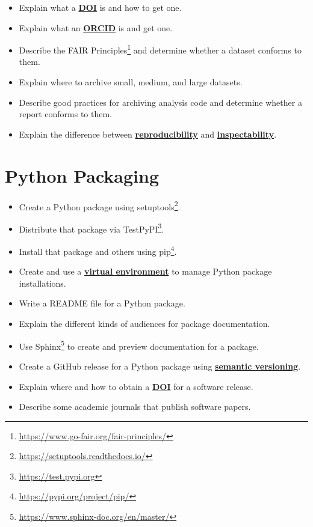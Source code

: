\documentclass[
]{krantz}
\providecommand{\tightlist}{%
  \setlength{\itemsep}{0pt}\setlength{\parskip}{0pt}}
\renewcommand{\href}[2]{#2\footnote{\url{#1}}}
\newcommand{\gref}[2]{\hyperlink{#2}{\textbf{#1}}}
\begin{document}
\begin{itemize}
\tightlist
\item
  Explain what a \gref{DOI}{doi} is and how to get one.
\item
  Explain what an \gref{ORCID}{orcid} is and get one.
\item
  Describe the \href{https://www.go-fair.org/fair-principles/}{FAIR Principles} and determine whether a dataset conforms to them.
\item
  Explain where to archive small, medium, and large datasets.
\item
  Describe good practices for archiving analysis code and determine whether a report conforms to them.
\item
  Explain the difference between \gref{reproducibility}{reproducible\_research} and \gref{inspectability}{inspectability}.
\end{itemize}

\hypertarget{python-packaging}{%
\section{Python Packaging}\label{python-packaging}}

\begin{itemize}
\tightlist
\item
  Create a Python package using \href{https://setuptools.readthedocs.io/}{setuptools}.
\item
  Distribute that package via \href{https://test.pypi.org}{TestPyPI}.
\item
  Install that package and others using \href{https://pypi.org/project/pip/}{pip}.
\item
  Create and use a \gref{virtual environment}{virtual\_environment} to manage Python package installations.
\item
  Write a README file for a Python package.
\item
  Explain the different kinds of audiences for package documentation.
\item
  Use \href{https://www.sphinx-doc.org/en/master/}{Sphinx} to create and preview documentation for a package.
\item
  Create a GitHub release for a Python package using \gref{semantic versioning}{semantic\_versioning}.
\item
  Explain where and how to obtain a \gref{DOI}{doi} for a software release.
\item
  Describe some academic journals that publish software papers.
\end{itemize}
\end{document}
